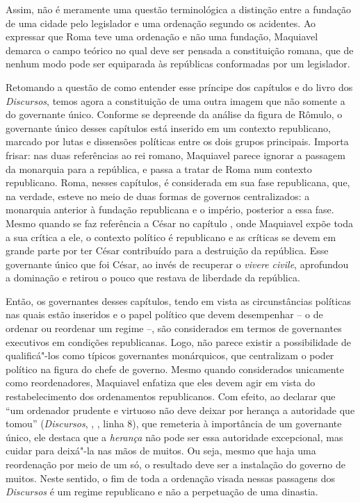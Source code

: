 Assim, não é meramente uma questão terminológica a distinção entre a
fundação de uma cidade pelo legislador e uma ordenação segundo os
acidentes. Ao expressar que Roma teve uma ordenação e não uma fundação,
Maquiavel demarca o campo teórico no qual deve ser pensada a
constituição romana, que de nenhum modo pode ser equiparada às
repúblicas conformadas por um legislador.

Retomando a questão de como entender esse príncipe dos capítulos  e 
do livro  dos \emph{Discursos}, temos agora a constituição de uma outra
imagem que não somente a do governante único. Conforme se depreende da
análise da figura de Rômulo, o governante único desses capítulos está
inserido em um contexto republicano, marcado por lutas e dissensões
políticas entre os dois grupos principais. Importa frisar: nas duas
referências ao rei romano, Maquiavel parece ignorar a passagem da
monarquia para a república, e passa a tratar de Roma num contexto
republicano. Roma, nesses capítulos, é considerada em sua fase
republicana, que, na verdade, esteve no meio de duas formas de governos
centralizados: a monarquia anterior à fundação republicana e o império,
posterior a essa fase. Mesmo quando se faz referência a César no
capítulo , onde Maquiavel expõe toda a sua crítica a ele, o contexto
político é republicano e as críticas se devem em grande parte por ter
César contribuído para a destruição da república. Esse governante único
que foi César, ao invés de recuperar o \emph{vivere civile}, aprofundou
a dominação e retirou o pouco que restava de liberdade da república.

Então, os governantes desses capítulos, tendo em vista as circunstâncias
políticas nas quais estão inseridos e o papel político que devem
desempenhar -- o de ordenar ou reordenar um regime --, são considerados
em termos de governantes executivos em condições republicanas. Logo, não
parece existir a possibilidade de qualificá"-los como típicos governantes
monárquicos, que centralizam o poder político na figura do chefe de
governo. Mesmo quando considerados unicamente como reordenadores,
Maquiavel enfatiza que eles devem agir em vista do restabelecimento dos
ordenamentos republicanos. Com efeito, ao declarar que ``um ordenador
prudente e virtuoso não deve deixar por herança a autoridade que tomou''
(\emph{Discursos}, , , linha 8), que remeteria à importância
de um governante único, ele destaca que a \emph{herança} não pode ser
essa autoridade excepcional, mas cuidar para deixá"-la nas mãos de
muitos. Ou seja, mesmo que haja uma reordenação por meio de um só, o
resultado deve ser a instalação do governo de muitos. Neste sentido, o
fim de toda a ordenação visada nessas passagens dos \emph{Discursos} é
um regime republicano e não a perpetuação de uma dinastia.

